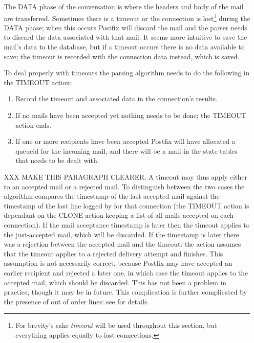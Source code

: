 The DATA phase of the \SMTP{} conversation is where the headers and body of
the mail are transferred.  Sometimes there is a timeout or the connection
is lost\footnote{For brevity's sake \textit{timeout\/} will be used
throughout this section, but everything applies equally to lost
connections.} during the DATA phase; when this occurs Postfix will discard
the mail and the parser needs to discard the data associated with that
mail.  It seems more intuitive to save the mail's data to the database, but
if a timeout occurs there is no data available to save; the timeout is
recorded with the connection data instead, which is saved.

To deal properly with timeouts the parsing algorithm needs to do the
following in the TIMEOUT action:

\begin{enumerate}

    \item Record the timeout and associated data in the connection's
        results.

    \item If no mails have been accepted yet nothing needs to be done; the
        TIMEOUT action ends.  

    \item If one or more recipients have been accepted Postfix will have
        allocated a queueid for the incoming mail, and there will be a mail
        in the state tables that needs to be dealt with.

\end{enumerate}

XXX MAKE THIS PARAGRAPH CLEARER\@.  A timeout may thus apply either to an
accepted mail or a rejected mail.  To distinguish between the two cases the
algorithm compares the timestamp of the last accepted mail against the
timestamp of the last line logged by  for that connection
(the TIMEOUT action is dependant on the CLONE action keeping a list of all
mails accepted on each connection).  If the mail acceptance timestamp is
later then the timeout applies to the just-accepted mail, which will be
discarded.  If the  timestamp is later there was a rejection
between the accepted mail and the timeout: the action assumes that the
timeout applies to a rejected delivery attempt and finishes.  This
assumption is not necessarily correct, because Postfix may have accepted an
earlier recipient and rejected a later one, in which case the timeout
applies to the accepted mail, which should be discarded.  This has not been
a problem in practice, though it may be in future.  This complication is
further complicated by the presence of out of order  lines:
see  for details.

